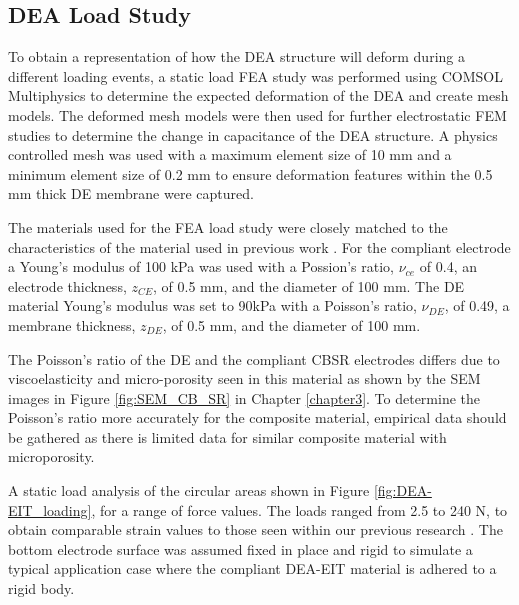 \subsection{DEA Load Study}
To obtain a representation of how the DEA structure will deform during a different loading events, a static load FEA study was performed using COMSOL Multiphysics \cite{COMSOL2022} to determine the expected deformation of the DEA and create mesh models. The deformed mesh models were then used for further electrostatic FEM studies to determine the change in capacitance of the DEA structure. A physics controlled mesh was used with a maximum element size of 10 mm and a minimum element size of 0.2 mm to ensure deformation features within the 0.5 mm thick DE membrane were captured.

The materials used for the FEA load study were closely matched to the characteristics of the material used in previous work \cite{Ellingham2024} . For the compliant electrode a Young's modulus of 100 kPa was used with a Possion's ratio, $\nu_{ce}$ of 0.4, an electrode thickness, $z_{CE}$, of 0.5 mm, and the diameter of 100 mm. The DE material Young's modulus was set to 90kPa with a Poisson's ratio, $\nu_{DE}$, of 0.49, a membrane thickness, $z_{DE}$, of 0.5 mm, and the diameter of 100 mm. 

The Poisson's ratio of the DE and the compliant CBSR electrodes differs due to viscoelasticity and micro-porosity seen in this material as shown by the SEM images in Figure \ref{fig:SEM_CB_SR} in Chapter \ref{chapter3}. To determine the Poisson's ratio more accurately for the composite material, empirical data should be gathered as there is limited data for similar composite material with microporosity.  %

A static load analysis of the circular areas shown in Figure \ref{fig:DEA-EIT_loading}, for a range of force values. The loads ranged from 2.5 to 240 N, to obtain comparable strain values to those seen within our previous research \cite{Ellingham2021,Ellingham2024} . The bottom electrode surface was assumed fixed in place and rigid to simulate a typical application case where the compliant DEA-EIT material is adhered to a rigid body.


